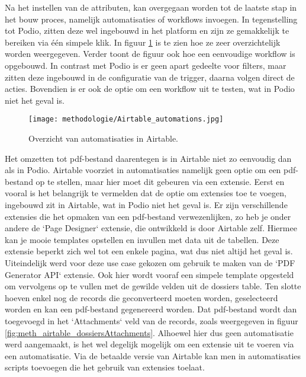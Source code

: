 Na het instellen van de attributen, kan overgegaan worden tot de laatste stap in het bouw proces, namelijk automatisaties of workflows invoegen. In tegenstelling tot Podio, zitten deze wel ingebouwd in het platform en zijn ze gemakkelijk te bereiken via één simpele klik. In figuur \ref{fig:meth_airtable_automations} is te zien hoe ze zeer overzichtelijk worden weergegeven. Verder toont de figuur ook hoe een eenvoudige workflow is opgebouwd. In contrast met Podio is er geen apart gedeelte voor filters, maar zitten deze ingebouwd in de configuratie van de trigger,  daarna volgen direct de acties. Bovendien is er ook de optie om een workflow uit te testen, wat in Podio niet het geval is. \\

\begin{figure}[h]
    \centering
    \texttt{[image: methodologie/Airtable\_automations.jpg]}
    \caption{Overzicht van automatisaties in Airtable.}
    \label{fig:meth_airtable_automations}
\end{figure}


Het omzetten tot pdf-bestand daarentegen is in Airtable niet zo eenvoudig dan als in Podio. Airtable voorziet in automatisaties namelijk geen optie om een pdf-bestand op te stellen, maar hier moet dit gebeuren via een extensie. Eerst en vooral is het belangrijk te vermelden dat de optie om extensies toe te voegen, ingebouwd zit in Airtable, wat in Podio niet het geval is. Er zijn verschillende extensies die het opmaken van een pdf-bestand verwezenlijken, zo heb je onder andere de `Page Designer` extensie, die ontwikkeld is door Airtable zelf. Hiermee kan je mooie templates opstellen en invullen met data uit de tabellen. Deze extensie beperkt zich wel tot een enkele pagina, wat dus niet altijd het geval is. Uiteindelijk werd voor deze use case gekozen om gebruik te maken van de `PDF Generator API` extensie. Ook hier wordt vooraf een simpele template opgesteld om vervolgens op te vullen met de gewilde velden uit de dossiers table. Ten slotte hoeven enkel nog de records die geconverteerd moeten worden, geselecteerd worden en kan een pdf-bestand gegenereerd worden. Dat pdf-bestand wordt dan toegevoegd in het `Attachments` veld van de records, zoals weergegeven in figuur \ref{fig:meth_airtable_dossiersAttachments}. Alhoewel hier dus geen automatisatie werd aangemaakt, is het wel degelijk mogelijk om een extensie uit te voeren via een automatisatie. Via de betaalde versie van Airtable kan men in automatisaties scripts toevoegen die het gebruik van extensies toelaat.  \\

